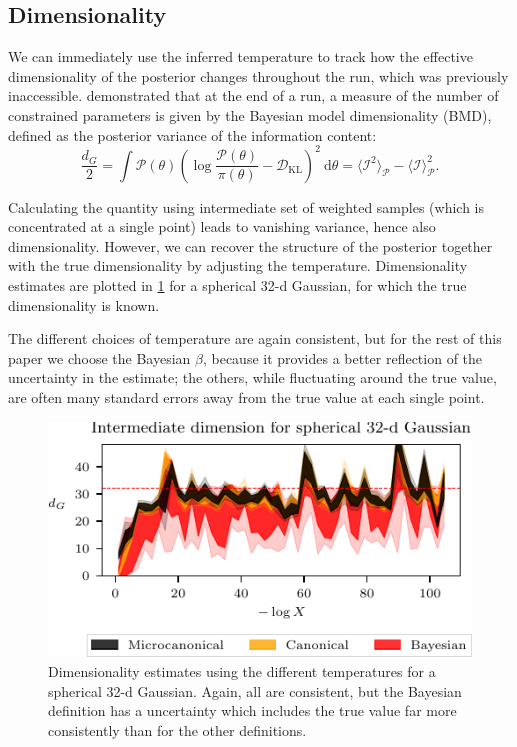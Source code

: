 \documentclass[usenatbib]{mnras}
\newcommand{\DKL}{\mathcal{D}_\mathrm{KL}}
\begin{document}
\subsection{Dimensionality}\label{sec:dimensionality}
We can immediately use the inferred temperature to track how the effective dimensionality of the posterior changes throughout the run, which was previously inaccessible. \citet{Handley_2019} demonstrated that at the end of a run, a measure of the number of constrained parameters is given by the Bayesian model dimensionality (BMD), defined as the posterior variance of the information content:
\begin{equation}
\frac{d_G}{2} = \int \mathcal{P}(\theta) \left(\log \frac{\mathcal{P}(\theta)}{\pi(\theta)} - \DKL\right)^2 \: \mathrm{d}\theta
= \langle \mathcal{I}^2 \rangle_\mathcal{P} - \langle \mathcal{I} \rangle^2_\mathcal{P}.
\end{equation}
\par
Calculating the quantity using intermediate set of weighted samples (which is concentrated at a single point) leads to vanishing variance, hence also dimensionality. However, we can recover the structure of the posterior together with the true dimensionality by adjusting the temperature. Dimensionality estimates are plotted in \cref{fig:d_G_spherical} for a spherical 32-d Gaussian, for which the true dimensionality is known. 
\par
The different choices of temperature are again consistent, but for the rest of this paper we choose the Bayesian $\beta$, because it provides a better reflection of the uncertainty in the estimate; the others, while fluctuating around the true value, are often many standard errors away from the true value at each single point.
\begin{figure}
\begin{center}
    \includegraphics{figures/d_G_spherical.pdf}
\end{center}
\caption{Dimensionality estimates using the different temperatures for a spherical 32-d Gaussian. Again, all are consistent, but the Bayesian definition has a uncertainty which includes the true value far more consistently than for the other definitions.}
\label{fig:d_G_spherical}
\end{figure}
\end{document}
